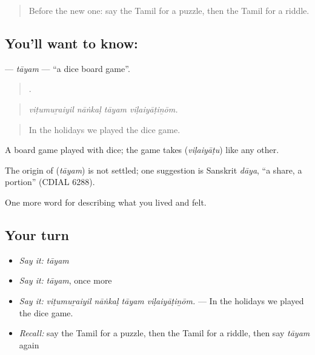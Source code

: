 \label{lesson:TA-C529-tayam}



\begin{quote}
Before the new one: say the Tamil for a puzzle, then the Tamil for a riddle.
\end{quote}

\subsection*{You'll want to know: }
\textbf{} — \emph{tāyam} — \textquotedblleft{}a dice board game\textquotedblright{}.

\begin{quote}
   .
\end{quote}

\begin{quote}
\emph{viṭumuṟaiyil nāṅkaḷ tāyam viḷaiyāṭiṉōm.}
\end{quote}

\begin{quote}
In the holidays we played the dice game.
\end{quote}

A board game played with dice; the game takes  (\emph{viḷaiyāṭu}) like any other.

\begin{cousinweb}
The origin of \textbf{} (\emph{tāyam}) is not settled; one suggestion is Sanskrit \emph{dāya}, \textquotedblleft{}a share, a portion\textquotedblright{} (CDIAL 6288).
\end{cousinweb}

\begin{grammarlens}[title={What you've built}]
One more word for describing what you lived and felt.
\end{grammarlens}

\subsection*{Your turn}
\begin{itemize}
\raggedright
  \item \emph{Say it:} \emph{tāyam}
  \item \emph{Say it:} \emph{tāyam}, once more
  \item \emph{Say it:} \emph{viṭumuṟaiyil nāṅkaḷ tāyam viḷaiyāṭiṉōm.} — In the holidays we played the dice game.
  \item \emph{Recall:} say the Tamil for a puzzle, then the Tamil for a riddle, then say \emph{tāyam} again
\end{itemize}

